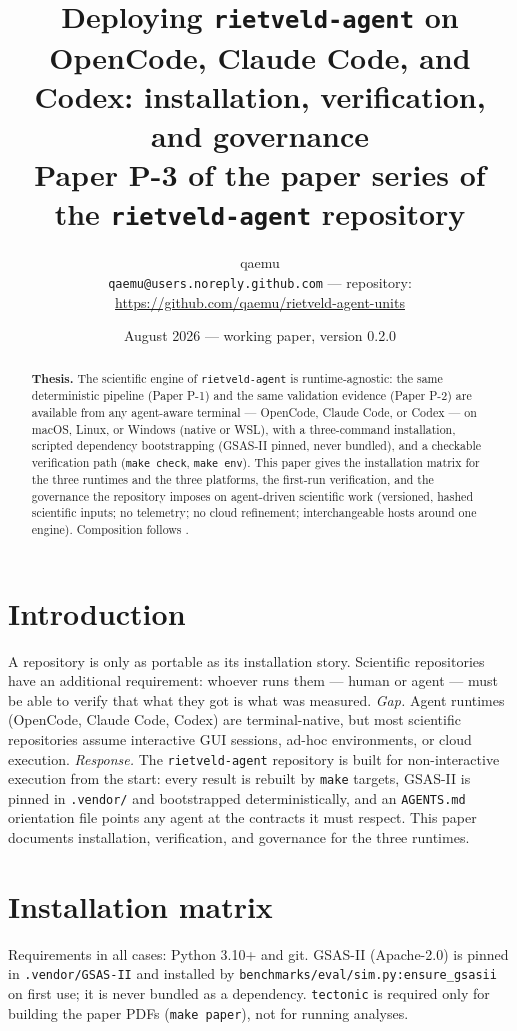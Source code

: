 \documentclass[11pt,a4paper]{article}
\title{\textbf{Deploying \texttt{rietveld-agent} on OpenCode, Claude Code,
and Codex: installation, verification, and governance}\\
\large Paper P-3 of the paper series of the
\texttt{rietveld-agent} repository}
\author{qaemu\\
\small \texttt{qaemu@users.noreply.github.com} --- repository:
\url{https://github.com/qaemu/rietveld-agent-units}}
\date{August 2026 --- working paper, version 0.2.0}
\begin{document}
\maketitle

\begin{abstract}
\noindent \textbf{Thesis.} The scientific engine of \texttt{rietveld-agent}
is runtime-agnostic: the same deterministic pipeline (Paper P-1) and the
same validation evidence (Paper P-2) are available from any agent-aware
terminal --- OpenCode, Claude Code, or Codex --- on macOS, Linux, or
Windows (native or WSL), with a three-command installation, scripted
dependency bootstrapping (GSAS-II pinned, never bundled), and a checkable
verification path (\texttt{make check}, \texttt{make env}). This paper
gives the installation matrix for the three runtimes and the three
platforms, the first-run verification, and the governance the repository
imposes on agent-driven scientific work (versioned, hashed scientific
inputs; no telemetry; no cloud refinement; interchangeable hosts around
one engine). Composition follows
\cite{drake2025fifteen}.
\end{abstract}

\section{Introduction}
A repository is only as portable as its installation story. Scientific
repositories have an additional requirement: whoever runs them --- human
or agent --- must be able to verify that what they got is what was
measured. \emph{Gap.} Agent runtimes (OpenCode, Claude Code, Codex) are
terminal-native, but most scientific repositories assume interactive
GUI sessions, ad-hoc environments, or cloud execution. \emph{Response.}
The \texttt{rietveld-agent} repository \cite{rietveld-agent} is built for
non-interactive execution from the start: every result is rebuilt by
\texttt{make} targets, GSAS-II \cite{toby2013gsas2} is pinned in
\texttt{.vendor/} and bootstrapped deterministically, and an
\texttt{AGENTS.md} orientation file points any agent at the contracts it
must respect. This paper documents installation, verification, and
governance for the three runtimes.

\section{Installation matrix}
Requirements in all cases: Python 3.10+ and git. GSAS-II (Apache-2.0) is
pinned in \texttt{.vendor/GSAS-II} and installed by
\texttt{benchmarks/eval/}\allowbreak\texttt{sim.py:ensure\_gsasii} on first use; it is never
bundled as a dependency. \texttt{tectonic} is required only for building
the paper PDFs (\texttt{make paper}), not for running analyses.
\end{document}
